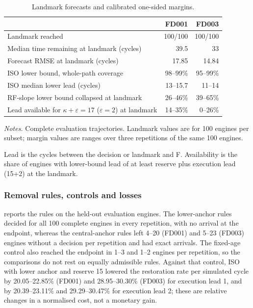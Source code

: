 \documentclass[preprint,12pt]{elsarticle}
\newcommand{\tablenotes}[1]{\par\smallskip\begin{minipage}{\linewidth}\footnotesize\raggedright\setlength{\parindent}{0pt}\setlength{\parskip}{0.35\baselineskip}\textit{Notes.} #1\end{minipage}}
\begin{document}
\begin{table}[htbp]
\centering
\caption{Landmark forecasts and calibrated one-sided margins.}
\label{tab:landmark-margin}
\footnotesize
\setlength{\tabcolsep}{3pt}
\begin{tabularx}{\linewidth}{@{}Xrr@{}}
\toprule
 & FD001 & FD003 \\
\midrule
Landmark reached & 100/100 & 100/100 \\
Median time remaining at landmark (cycles) & 39.5 & 33 \\
Forecast RMSE at landmark (cycles) & 17.85 & 14.84 \\
ISO lower bound, whole-path coverage & 98--99\% & 95--99\% \\
ISO median lower lead (cycles) & 13--15.7 & 11--14 \\
RF-slope lower bound collapsed at landmark & 26--46\% & 39--65\% \\
Lead available for $\kappa+\varepsilon=17$ ($\varepsilon=2$) at landmark & 14--35\% & 0--26\% \\
\bottomrule
\end{tabularx}
\tablenotes{Complete evaluation trajectories. Landmark values are for 100 engines per subset; margin values are ranges over three repetitions of the same 100 engines.

Lead is the cycles between the decision or landmark and F. Availability is the share of engines with lower-bound lead of at least reserve plus execution lead (15+2) at the landmark.}
\end{table}

\subsubsection{Removal rules, controls and losses}\label{sec:decision-results}


 reports the rules on the held-out evaluation engines. The lower-anchor rules decided for all 100 complete engines in every repetition, with no arrival at the endpoint, whereas the central-anchor rules left 4--20 (FD001) and 5--23 (FD003) engines without a decision per repetition and had exact arrivals. The fixed-age control also reached the endpoint in 1--3 and 1--2 engines per repetition, so the comparisons do not rest on equally admissible rules. Against that control, ISO with lower anchor and reserve 15 lowered the restoration rate per simulated cycle by 20.05--22.85\% (FD001) and 28.95--30.30\% (FD003) for execution lead 1, and by 20.39--23.11\% and 29.29--30.47\% for execution lead 2; these are relative changes in a normalised cost, not a monetary gain.
\end{document}

